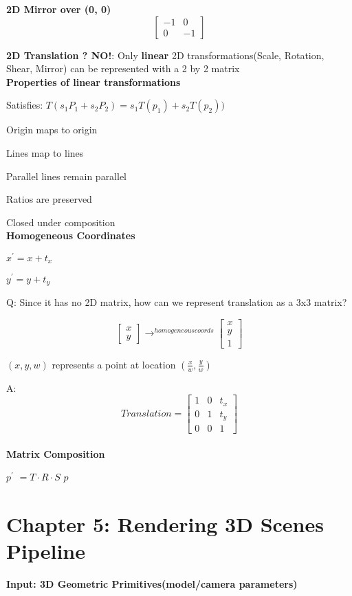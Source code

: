 \documentclass[]{report}
\begin{document}
\textbf{2D Mirror over (0, 0)}
$$
\begin{bmatrix}
-1 & 0\\
0 & -1
\end{bmatrix}
$$

\textbf{2D Translation ? NO!}: Only \textbf{linear} 2D transformations(Scale, Rotation, Shear, Mirror) can be represented with a 2 by 2 matrix
\\
\textbf{Properties of linear transformations}

Satisfies: $T(s_{1}P_{1}+s_{2}P_{2}) = s_{1}T(p_{1})+s_{2}T(p_{2}))$

Origin maps to origin

Lines map to lines

Parallel lines remain parallel

Ratios are preserved

Closed under composition\\

\textbf{Homogeneous Coordinates}

$x^{'} = x + t_{x}$

$y^{'} = y + t_{y}$

Q: Since it has no 2D matrix, how can we represent
translation as a 3x3 matrix?

$$
\begin{bmatrix}
	x\\
	y
\end{bmatrix}
\rightarrow^{homogeneous coords}
\begin{bmatrix}
	x\\
	y\\
	1
\end{bmatrix}
$$

$(x, y, w)$ represents a point at location $(\frac{x}{w}, \frac{y}{w})$

A: $$Translation = 
\begin{bmatrix}
1 & 0 & t_x\\
0 & 1 & t_y\\
0 & 0 & 1
\end{bmatrix}
$$
\\
\textbf{Matrix Composition}

\textbf{$p^{'}$} $= T \cdot R \cdot S$ \textbf{$p$}


\section*{Chapter 5: Rendering 3D Scenes Pipeline}
\textbf{Input: 3D Geometric Primitives(model/camera parameters)}
\end{document}
